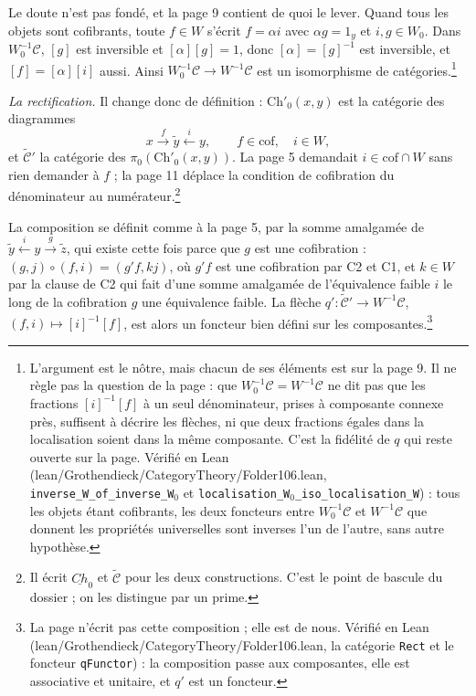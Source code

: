 \documentclass[11pt,a4paper]{article}
\begin{document}
Le doute n'est pas fondé, et la page 9 contient de quoi le lever. Quand tous
les objets sont cofibrants, toute $f \in W$ s'écrit $f = \alpha i$ avec
$\alpha g = 1_{y}$ et $i, g \in W_{0}$. Dans $W_{0}^{-1}\mathcal{C}$, $[g]$ est
inversible et $[\alpha][g] = 1$, donc $[\alpha] = [g]^{-1}$ est inversible, et
$[f] = [\alpha][i]$ aussi. Ainsi $W_{0}^{-1}\mathcal{C} \to W^{-1}\mathcal{C}$
est un isomorphisme de catégories.\footnote{L'argument est le nôtre, mais
chacun de ses éléments est sur la page 9. Il ne règle pas la question de la
page : que $W_{0}^{-1}\mathcal{C} = W^{-1}\mathcal{C}$ ne dit pas que les
fractions $[i]^{-1}[f]$ à un seul dénominateur, prises à composante connexe
près, suffisent à décrire les flèches, ni que deux fractions égales dans la
localisation soient dans la même composante. C'est la fidélité de $q$ qui
reste ouverte sur la page. Vérifié en Lean (lean/Grothendieck/CategoryTheory/Folder106.lean,
\texttt{inverse\_W\_of\_inverse\_W}$_{0}$ et
\texttt{localisation\_W}$_{0}$\texttt{\_iso\_localisation\_W}) : tous les objets
étant cofibrants, les deux foncteurs entre $W_{0}^{-1}\mathcal{C}$ et
$W^{-1}\mathcal{C}$ que donnent les propriétés universelles sont inverses
l'un de l'autre, sans autre hypothèse.}

\emph{La rectification.} Il change donc de définition : $\mathrm{Ch}'_{0}(x,y)$
est la catégorie des diagrammes
\[
x \xrightarrow{\;f\;} \widetilde{y} \xleftarrow{\;i\;} y,
\qquad f \in \mathrm{cof}, \quad i \in W,
\]
et $\widetilde{\mathcal{C}}'$ la catégorie des $\pi_{0}(\mathrm{Ch}'_{0}(x,y))$.
La page 5 demandait $i \in \mathrm{cof} \cap W$ sans rien demander à $f$ ;
la page 11 déplace la condition de cofibration du dénominateur au
numérateur.\footnote{Il écrit $\underline{Ch}_{0}$ et $\widetilde{\mathcal{C}}$
pour les deux constructions. C'est le point de bascule du dossier ; on les
distingue par un prime.}

La composition se définit comme à la page 5, par la somme amalgamée de
$\widetilde{y} \xleftarrow{i} y \xrightarrow{g} \widetilde{z}$, qui existe
cette fois parce que $g$ est une cofibration : $(g, j) \circ (f, i) = (g'f, kj)$, où $g'f$ est une cofibration par C2 et C1, et $k \in W$ par la clause de
C2 qui fait d'une somme amalgamée de l'équivalence faible $i$ le long de la
cofibration $g$ une équivalence faible. La flèche $q' :
\widetilde{\mathcal{C}}' \to W^{-1}\mathcal{C}$, $(f, i) \mapsto
[i]^{-1}[f]$, est alors un foncteur bien défini sur les
composantes.\footnote{La page n'écrit pas cette composition ; elle est de
nous. Vérifié en Lean (lean/Grothendieck/CategoryTheory/Folder106.lean, la catégorie
\texttt{Rect} et le foncteur \texttt{qFunctor}) : la composition passe aux
composantes, elle est associative et unitaire, et $q'$ est un foncteur.}
\end{document}
